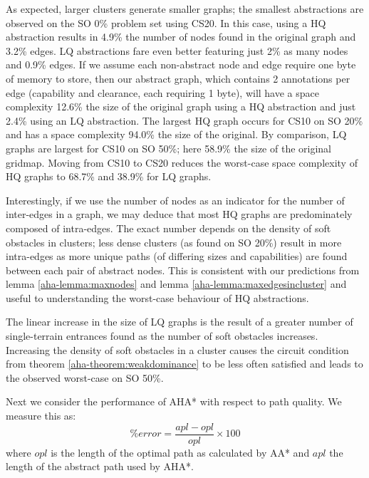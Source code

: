 As expected, larger clusters generate smaller graphs; the smallest abstractions are observed on the SO 0\% problem set using CS20. 
In this case, using a HQ abstraction results in 4.9\% the number of nodes found in the original graph and 3.2\% edges. 
LQ abstractions fare even better featuring just 2\% as many nodes and 0.9\% edges.
If we assume each non-abstract node and edge require one byte of memory to store, then our abstract graph, which contains 2 annotations per edge (capability and clearance, each requiring 1 byte), will have a space complexity 12.6\% the size of the original graph using a HQ abstraction and just 2.4\% using an LQ abstraction.
The largest HQ graph occurs for CS10 on SO 20\% and has a space complexity 94.0\% the size of the original.
By comparison, LQ graphs are largest for CS10 on SO 50\%; here 58.9\% the size of the original gridmap.
Moving from CS10 to CS20 reduces the worst-case space complexity of HQ graphs to 68.7\% and 38.9\% for LQ graphs.
\par \indent
Interestingly, if we use the number of nodes as an indicator for the number of inter-edges in a graph, we may deduce that most HQ graphs are predominately composed of intra-edges. 
The exact number depends on the density of soft obstacles in clusters; less dense clusters (as found on SO 20\%) result in more intra-edges as more unique paths (of differing sizes and capabilities) are found between each pair of abstract nodes. 
This is consistent with our predictions from lemma \ref{aha-lemma:maxnodes} and lemma \ref{aha-lemma:maxedgesincluster} and useful to understanding the worst-case behaviour of HQ abstractions.
\par \indent
The linear increase in the size of LQ graphs is the result of a greater number of single-terrain entrances found as the number of soft obstacles increases.
Increasing the density of soft obstacles in a cluster causes the circuit condition from theorem \ref{aha-theorem:weakdominance} to be less often satisfied and leads to the observed worst-case on SO 50\%.
\par \indent
Next we consider the performance of AHA* with respect to path quality. We measure this as:
$$ \%error = \frac{apl - opl}{opl} \times 100 $$ where $opl$ is the length of the optimal path as calculated by AA* and $apl$ the length of the abstract path used by AHA*.
